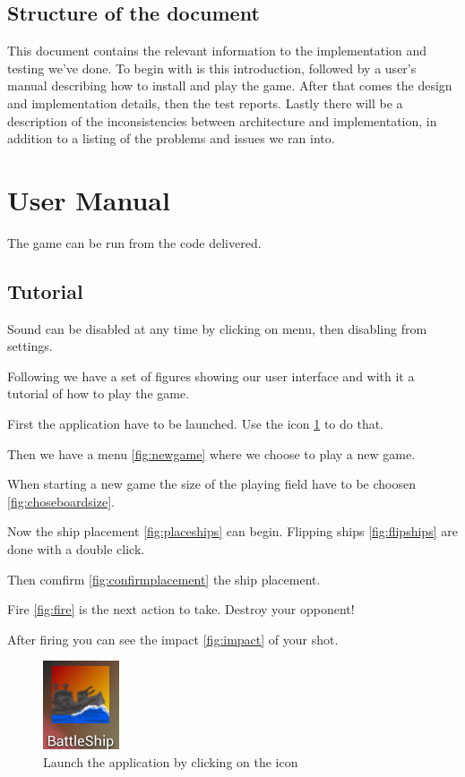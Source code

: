 \documentclass[12pt, a4paper]{article}
\begin{document}
\subsection{Structure of the document}
This document contains the relevant information to the implementation and
testing we’ve done. To begin with is this introduction, followed by a user’s
manual describing how to install and play the game. After that comes the design
and implementation details, then the test reports. Lastly there will be a
description of the inconsistencies between architecture and implementation, in
addition to a listing of the problems and issues we ran into.

\section{User Manual}
The game can be run from the code delivered.  

\subsection{Tutorial}
Sound can be disabled at any time by clicking on menu, then disabling from
settings.

Following we have a set of figures showing our user interface and with it a
tutorial of how to play the game. 

First the application have to be launched. Use the icon \ref{fig:starticon} to do
that. 

Then we have a menu \ref{fig:newgame} where we choose to play a new game. 

When starting a new game the size of the playing field have to be choosen
\ref{fig:choseboardsize}.

Now the ship placement \ref{fig:placeships} can begin. Flipping ships
\ref{fig:flipships} are done with a double click. 

Then comfirm \ref{fig:confirmplacement} the ship placement. 

Fire \ref{fig:fire} is the next action to take. Destroy your opponent!

After firing you can see the impact \ref{fig:impact} of your shot. 

\begin{figure}[h!]
    \centering
    \includegraphics[width=.4\textwidth]{starticon} 
    \caption{Launch the application by clicking on the icon}
    \label{fig:starticon}
\end{figure}
\end{document}
